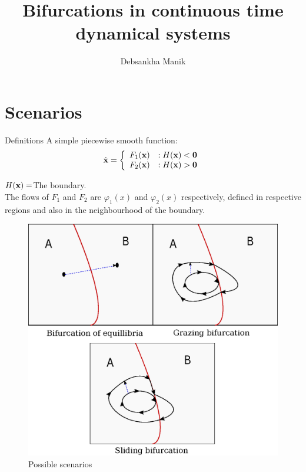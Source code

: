 \documentclass[xcolor=x11names,compress]{beamer}
\renewcommand{\(}{\begin{columns}}
\renewcommand{\)}{\end{columns}}
\newcommand{\<}[1]{\begin{column}{#1}}
\renewcommand{\>}{\end{column}}
\begin{document}
\title{Bifurcations in continuous time dynamical systems}
\author{Debsankha Manik}

\begin{frame}


\titlepage

\end{frame}



\section{Scenarios}
\begin{frame}{Definitions}
A simple piecewise smooth function:
\begin{displaymath}
   \dot{\bf{x}} = \left\{
     \begin{array}{lr}
       F_1(\bf{x}) & : H(\bf{x})<0\\
       F_2(\bf{x}) & : H(\bf{x})>0
     \end{array}
   \right.
\end{displaymath}

$H(\bf{x})=$The boundary.  \\


The flows of $F_1$ and $F_2$ are $\varphi_1(x)$ and $\varphi_2(x)$ 
respectively, defined in respective regions and also in the neighbourhood of 
the boundary.  


\end{frame}

\begin{frame}
\begin{figure}
\caption{Possible scenarios}
\begin{center}
\includegraphics[height=0.9\textheight]{c-bifs}
\end{center}
\end{figure}

\end{frame}
\end{document}
